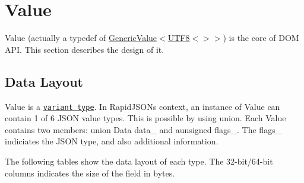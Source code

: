 \hypertarget{md_Commun_Externe_RapidJSON_doc_internals_Value}{}\section{Value}\label{md_Commun_Externe_RapidJSON_doc_internals_Value}
{\ttfamily Value} (actually a typedef of {\ttfamily \hyperlink{class_generic_value}{Generic\+Value}$<$\hyperlink{struct_u_t_f8}{U\+T\+F8}$<$$>$$>$}) is the core of D\+OM A\+PI. This section describes the design of it.\hypertarget{md_Commun_Externe_RapidJSON_doc_internals_DataLayout}{}\subsection{Data Layout}\label{md_Commun_Externe_RapidJSON_doc_internals_DataLayout}
{\ttfamily Value} is a \href{http://en.wikipedia.org/wiki/Variant_type}{\tt variant type}. In Rapid\+J\+S\+ON\textquotesingle{}s context, an instance of {\ttfamily Value} can contain 1 of 6 J\+S\+ON value types. This is possible by using {\ttfamily union}. Each {\ttfamily Value} contains two members\+: {\ttfamily union Data data\+\_\+} and a{\ttfamily unsigned flags\+\_\+}. The {\ttfamily flags\+\_\+} indiciates the J\+S\+ON type, and also additional information.

The following tables show the data layout of each type. The 32-\/bit/64-\/bit columns indicates the size of the field in bytes.

